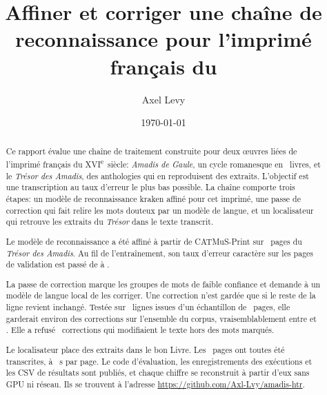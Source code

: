 \documentclass[11pt,a4paper]{article}
\title{Affiner et corriger une chaîne de reconnaissance
  pour l'imprimé français du \sxvi}
\author{Axel Levy}
\date{\today}
\newcommand{\sxvi}{XVI\textsuperscript{\upshape\lowercase{e}}~siècle}
\begin{document}
\reportmaketitle

\begin{abstract}
Ce rapport évalue une chaîne de traitement construite pour deux œuvres liées
de l'imprimé français du \sxvi: \emph{Amadis de Gaule}, un cycle romanesque en
\ocrBooks{}~livres, et le \emph{Trésor des Amadis}, des anthologies qui en
reproduisent des extraits. L'objectif est une transcription au taux d'erreur le
plus bas possible. La chaîne comporte trois étapes: un modèle de
reconnaissance kraken affiné pour cet imprimé, une passe de correction qui fait
relire les mots douteux par un modèle de langue, et un localisateur qui
retrouve les extraits du \emph{Trésor} dans le texte transcrit.

Le modèle de reconnaissance a été affiné à partir de CATMuS-Print sur
\trainPages{}~pages du \emph{Trésor des Amadis}. Au fil de l'entraînement, son
taux d'erreur caractère sur les pages de validation est passé de
\trainCerFirstEpoch{} à \trainCer{}.

La passe de correction marque les groupes de mots de faible confiance et
demande à un modèle de langue local de les corriger. Une correction n'est
gardée que si le reste de la ligne revient inchangé. Testée sur
\corrOffered{}~lignes issues d'un échantillon de \corrPages{}~pages, elle
garderait environ \corrAcceptRate{} des corrections sur l'ensemble du corpus,
vraisemblablement entre \corrAcceptLow{} et \corrAcceptHigh{}. Elle
a refusé \corrRewritesCaught{}~corrections qui modifiaient le texte hors des
mots marqués.

Le localisateur place \locLivreAccuracyWorkbook{} des extraits dans le bon
Livre. Les \ocrPages{}~pages ont toutes été transcrites, à
\ocrSecondsPerPage{}~s par page. Le code d'évaluation, les enregistrements des
exécutions et les CSV de résultats sont publiés, et chaque chiffre se
reconstruit à partir d'eux sans GPU ni réseau. Ils se trouvent à l'adresse
\url{https://github.com/Axl-Lvy/amadis-htr}.


\end{abstract}
\end{document}
